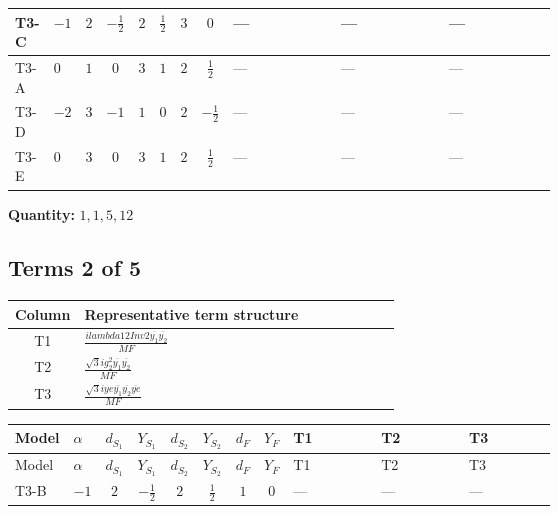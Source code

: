 \documentclass[8pt]{article}
\begin{document}
\begin{landscape}
\begin{longtable}{@{}llcccccc >{\raggedright\arraybackslash}p{0.21\linewidth} >{\raggedright\arraybackslash}p{0.21\linewidth} >{\raggedright\arraybackslash}p{0.21\linewidth}@{}}
\midrule
T3-C & $-1$ & $2$ & $-\frac{1}{2}$ & $2$ & $\frac{1}{2}$ & $3$ & $0$ & --- & --- & --- \\
\midrule
T3-A & $0$ & $1$ & $0$ & $3$ & $1$ & $2$ & $\frac{1}{2}$ & --- & --- & --- \\
\midrule
T3-D & $-2$ & $3$ & $-1$ & $1$ & $0$ & $2$ & $-\frac{1}{2}$ & --- & --- & --- \\
\midrule
T3-E & $0$ & $3$ & $0$ & $3$ & $1$ & $2$ & $\frac{1}{2}$ & --- & --- & --- \\
\midrule
\bottomrule
\end{longtable}
\clearpage
\noindent\textbf{Quantity: }$\mathrm{1,1,5,12}$\par\smallskip
\subsection*{Terms 2 of 5}
\begin{center}
\begin{tabular}{@{}c >{\raggedright\arraybackslash}p{0.82\linewidth}@{}}
\toprule
Column & Representative term structure \\
\midrule
T1 & \(\displaystyle \frac{i lambda12Inv2 \overline{y_{1}} \overline{y_{2}}}{MF}\) \\
\midrule
T2 & \(\displaystyle \frac{\sqrt{3} i g_{2}^{2} \overline{y_{1}} \overline{y_{2}}}{MF}\) \\
\midrule
T3 & \(\displaystyle \frac{\sqrt{3} i ye \overline{y_{1}} \overline{y_{2}} \overline{ye}}{MF}\) \\
\midrule
\bottomrule
\end{tabular}
\end{center}
\smallskip
\tiny
\begin{longtable}{@{}llcccccc >{\raggedright\arraybackslash}p{0.21\linewidth} >{\raggedright\arraybackslash}p{0.21\linewidth} >{\raggedright\arraybackslash}p{0.21\linewidth}@{}}
\toprule
Model & $\alpha$ & $d_{S_1}$ & $Y_{S_1}$ & $d_{S_2}$ & $Y_{S_2}$ & $d_F$ & $Y_F$ & T1 & T2 & T3 \\
\midrule
\endfirsthead
\toprule
Model & $\alpha$ & $d_{S_1}$ & $Y_{S_1}$ & $d_{S_2}$ & $Y_{S_2}$ & $d_F$ & $Y_F$ & T1 & T2 & T3 \\
\midrule
\endhead
T3-B & $-1$ & $2$ & $-\frac{1}{2}$ & $2$ & $\frac{1}{2}$ & $1$ & $0$ & --- & --- & --- \\
\midrule

\end{longtable}
\end{landscape}
\end{document}
